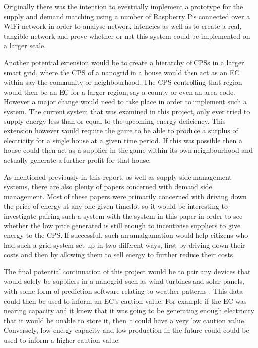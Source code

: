 \documentclass[a4paper, notitlepage]{report}
\begin{document}
Originally there was the intention to eventually implement a prototype for the
supply and demand matching using a number of Raspberry Pis connected over a WiFi
network in order to analyse network latencies as well as to create a real,
tangible network and prove whether or not this system could be implemented on a
larger scale.

Another potential extension would be to create a hierarchy of CPSs in a larger
smart grid, where the CPS of a nanogrid in a house would then act as an EC
within say the community or neighbourhood. The CPS controlling that region would
then be an EC for a larger region, say a county or even an area code. However a
major change would need to take place in order to implement such a system. The
current system that was examined in this project, only ever tried to supply
energy less than or equal to the upcoming energy deficiency. This extension
however would require the game to be able to produce a surplus of electricity
for a single house at a given time period. If this was possible then a house
could then act as a supplier in the game within its own neighbourhood and
actually generate a further profit for that house. 

As mentioned previously in this report, as well as supply side management
systems, there are also plenty of papers concerned with demand side management.
Most of these papers were primarily concerned with driving down the price of
energy at any one given timeslot so it would be interesting to investigate
pairing such a system with the system in this paper in order to see whether the
low price generated is still enough to incentivise suppliers to give energy to
the CPS. If successful, such an amalgamation would help citizens who had such a
grid system set up in two different ways, first by driving down their costs and
then by allowing them to sell energy to further reduce their costs.

The final potential continuation of this project would be to pair any devices
that would solely be suppliers in a nanogrid such as wind turbines and solar
panels, with some form of prediction software relating to weather patterns
\cite{foley2012current}. This data could then be used to inform an EC's caution
value. For example if the EC was nearing capacity and it knew that it was going
to be generating enough electricity that it would be unable to store it, then it
could have a very low caution value. Conversely, low energy capacity and low
production in the future could could be used to inform a higher caution value.

\printbibliography
\appendix
\end{document}
